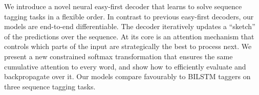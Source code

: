 We introduce a novel neural easy-first decoder that learns to solve sequence tagging tasks in a flexible order. In contrast to previous easy-first decoders, our models are end-to-end differentiable. The decoder iteratively updates a ``sketch'' of the predictions over the sequence. At its core is an attention mechanism that controls which parts of the input are strategically the best to process next. We present a new constrained softmax transformation that ensures the same cumulative attention to every word, and show how to efficiently evaluate and backpropagate over it. Our models compare favourably to BILSTM taggers on three sequence tagging tasks.
